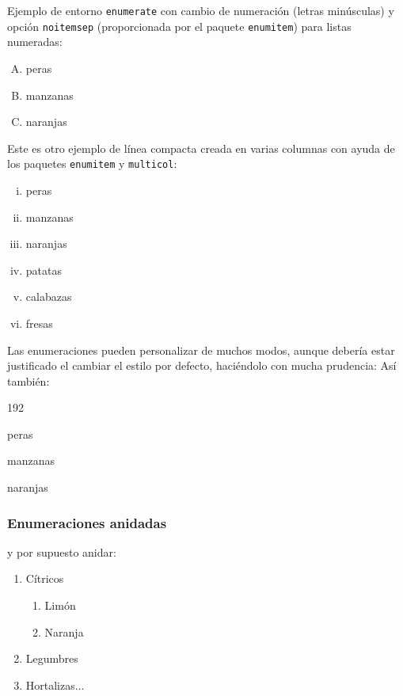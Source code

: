\documentclass[11pt,a4paper]{article}
\begin{document}
\noindent Ejemplo de entorno {\tt enumerate} con cambio de numeración (letras minúsculas) y opción \texttt{noitemsep} (proporcionada por el paquete \texttt{enumitem}) para listas numeradas:

\begin{enumerate}[A.-,noitemsep]
	\item peras
	\item manzanas
	\item naranjas
\end{enumerate}

\noindent Este es otro ejemplo de línea compacta creada en varias columnas con ayuda de los paquetes \texttt{enumitem} y \texttt{multicol}:
\begin{multicols}{2} %
	\begin{enumerate}[i.,noitemsep]
		\item peras
		\item manzanas
		\item naranjas
		\item patatas
		\item calabazas
		\item fresas
	\end{enumerate}
\end{multicols}


\noindent Las enumeraciones pueden personalizar de muchos modos, aunque debería estar justificado el cambiar el estilo por defecto, haciéndolo con mucha prudencia:
\noindent Así también:

\begin{dingautolist}{192} %
	\item peras
	\item manzanas
	\item naranjas
\end{dingautolist}




\subsubsection{Enumeraciones anidadas}
\label{sec:enumanidadas}

\noindent y por supuesto anidar:

\begin{enumerate}
  \item Cítricos
  \begin{enumerate}
    \item Limón
    \item Naranja
  \end{enumerate}
  \item Legumbres
  \item Hortalizas...
\end{enumerate}
\end{document}
